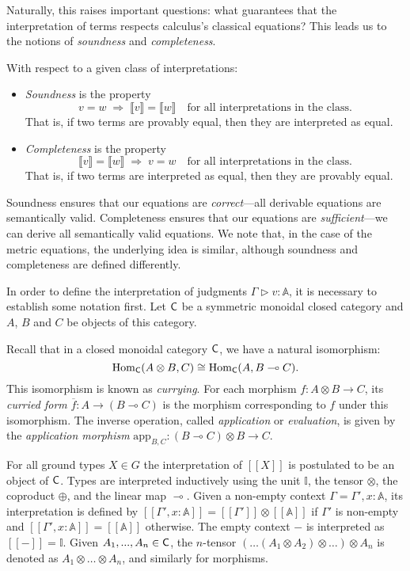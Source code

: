 Naturally, this raises important questions: what guarantees that the interpretation of terms respects calculus's classical equations? This leads us to the notions of \emph{soundness} and \emph{completeness}.

With respect to a given class of interpretations:
\begin{itemize}
  \item \emph{Soundness} is the property 
  \[
  v = w \;\Rightarrow\; \llbracket v \rrbracket = \llbracket w \rrbracket
  \quad \text{for all interpretations in the class.}
  \]
  That is, if two terms are provably equal, then they are interpreted as equal.
  
  \item \emph{Completeness} is the property 
  \[
  \llbracket v \rrbracket = \llbracket w \rrbracket
  \;\Rightarrow\; v = w
  \quad \text{for all interpretations in the class.}
  \]
  That is, if two terms are interpreted as equal, then they are provably equal.
\end{itemize}

Soundness ensures that our equations are \emph{correct}—all derivable equations are semantically valid. Completeness ensures that our equations are \emph{sufficient}—we can derive all semantically valid equations.
We note that, in the case of the metric equations, the underlying idea is similar, although soundness and completeness are defined differently.

\vspace{20pt}

In order to define the interpretation of judgments $\Gamma \triangleright v: \mathbb{A}$, it is necessary to establish some notation first. Let $\mathsf{C}$ be a symmetric monoidal closed category and $A$, $B$ and $C$ be objects of this category. 

Recall that in a closed monoidal category $\mathsf{C}$, we have a natural isomorphism:
\[
\mathrm{Hom}_{\mathsf{C}}(A \otimes B, C) \cong \mathrm{Hom}_{\mathsf{C}}(A, B \multimap C).
\]
This isomorphism is known as \emph{currying}. For each morphism $f \colon A \otimes B \to C$, its \emph{curried form} $\overline{f} \colon A \to (B \multimap C)$ is the morphism corresponding to $f$ under this isomorphism.
The inverse operation, called \emph{application} or \emph{evaluation}, is given by the \emph{application morphism} $\text{app}_{B,C} \colon (B \multimap C) \otimes B \to C$.


For all ground types $X \in G$  the interpretation of $[\![X]\!]$  is postulated  to be an object of $\mathsf{C}$. Types are interpreted inductively using the unit $\mathbb{I}$, the tensor $\otimes$, the coproduct $\oplus$, and the linear map $\multimap$. Given a non-empty context $\Gamma=\Gamma',x: \mathbb{A}$, its interpretation is defined by $[\![\Gamma',x: \mathbb{A}]\!] = [\![\Gamma']\!] \otimes [\![\mathbb{A}]\!]$ if $\Gamma'$ is non-empty and $[\![\Gamma',x: \mathbb{A}]\!] = [\![\mathbb{A}]\!]$ otherwise. The empty context $-$ is interpreted as $[\![-]\!] = \mathbb{I}$. Given $A_{1}, . . . ,A_{n} \in \mathsf{C}$, the $n$-tensor $(\ldots (A_1 \otimes A_2) \otimes \ldots ) \otimes A_{n}$ is denoted as $A_1 \otimes \ldots \otimes A_{n}$, and similarly for morphisms. 



